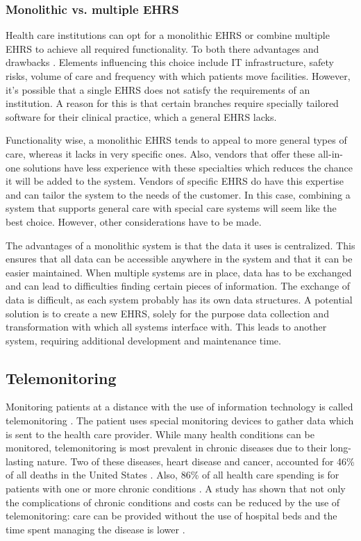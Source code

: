         \subsubsection{Monolithic vs. multiple EHRS} \label{ehrs_comparison}

        Health care institutions can opt for a monolithic EHRS or combine multiple EHRS to achieve all required functionality. To both there advantages and drawbacks \cite{multiple_ehrs}. Elements influencing this choice include IT infrastructure, safety risks, volume of care and frequency with which patients move facilities. However, it's possible that a single EHRS does not satisfy the requirements of an institution. A reason for this is that certain branches require specially tailored software for their clinical practice, which a general EHRS lacks. 

        Functionality wise, a monolithic EHRS tends to appeal to more general types of care, whereas it lacks in very specific ones. Also, vendors that offer these all-in-one solutions have less experience with these specialties which reduces the chance it will be added to the system. Vendors of specific EHRS do have this expertise and can tailor the system to the needs of the customer. In this case, combining a system that supports general care with special care systems will seem like the best choice. However, other considerations have to be made.

        The advantages of a monolithic system is that the data it uses is centralized. This ensures that all data can be accessible anywhere in the system and that it can be easier maintained. When multiple systems are in place, data has to be exchanged and can lead to difficulties finding certain pieces of information. The exchange of data is difficult, as each system probably has its own data structures. A potential solution is to create a new EHRS, solely for the purpose data collection and transformation with which all systems interface with. This leads to another system, requiring additional development and maintenance time.
    
    \subsection{Telemonitoring} \label{2_telemonitoring}
    Monitoring patients at a distance with the use of information technology is called telemonitoring \cite{systematic_review}. The patient uses special monitoring devices to gather data which is sent to the health care provider. While many health conditions can be monitored, telemonitoring is most prevalent in chronic diseases due to their long-lasting nature. Two of these diseases, heart disease and cancer, accounted for 46\% of all deaths in the United States \cite{national2016health}. Also, 86\% of all health care spending is for patients with one or more chronic conditions \cite{gerteis2014multiple}. A study has shown that not only the complications of chronic conditions and costs can be reduced by the use of telemonitoring: care can be provided without the use of hospital beds and the time spent managing the disease is lower \cite{telemonitoring_current_state}.

